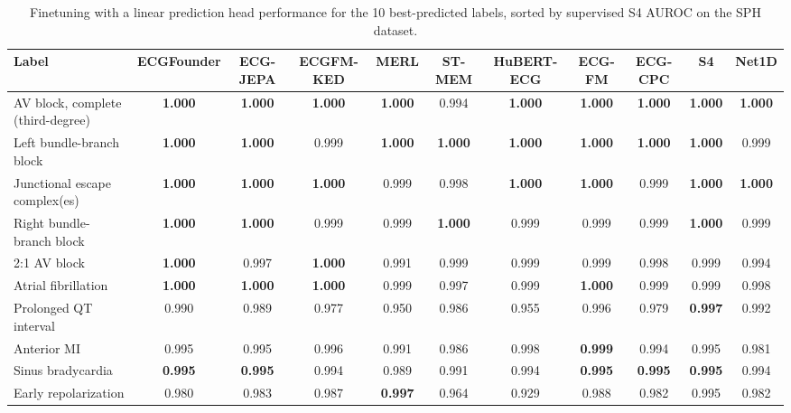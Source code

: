 \documentclass{article}
\begin{document}
                \begin{table}[htbp]
                    \centering
                    \tiny
                    \setlength{\tabcolsep}{2pt}
                    \caption{Finetuning with a linear prediction head performance for the 10 best-predicted labels, sorted by supervised S4 AUROC on the SPH dataset.}
                    \begin{tabular}{lcccccccccc}
                        \toprule
                        \textbf{Label} & \textbf{ECGFounder} & \textbf{ECG-JEPA} & \textbf{ECGFM-KED} & \textbf{MERL} & \textbf{ST-MEM} & \textbf{HuBERT-ECG} & \textbf{ECG-FM} & \textbf{ECG-CPC} & \textbf{S4} & \textbf{Net1D} \\
                        \midrule
                        AV block, complete (third-degree) & \textbf{1.000} & \textbf{1.000} & \textbf{1.000} & \textbf{1.000} & 0.994 & \textbf{1.000} & \textbf{1.000} & \textbf{1.000} & \textbf{1.000} & \textbf{1.000} \\
                        Left bundle-branch block & \textbf{1.000} & \textbf{1.000} & 0.999 & \textbf{1.000} & \textbf{1.000} & \textbf{1.000} & \textbf{1.000} & \textbf{1.000} & \textbf{1.000} & 0.999 \\
                        Junctional escape complex(es) & \textbf{1.000} & \textbf{1.000} & \textbf{1.000} & 0.999 & 0.998 & \textbf{1.000} & \textbf{1.000} & 0.999 & \textbf{1.000} & \textbf{1.000} \\
                        Right bundle-branch block & \textbf{1.000} & \textbf{1.000} & 0.999 & 0.999 & \textbf{1.000} & 0.999 & 0.999 & 0.999 & \textbf{1.000} & 0.999 \\
                        2:1 AV block & \textbf{1.000} & 0.997 & \textbf{1.000} & 0.991 & 0.999 & 0.999 & 0.999 & 0.998 & 0.999 & 0.994 \\
                        Atrial fibrillation & \textbf{1.000} & \textbf{1.000} & \textbf{1.000} & 0.999 & 0.997 & 0.999 & \textbf{1.000} & 0.999 & 0.999 & 0.998 \\
                        Prolonged QT interval & 0.990 & 0.989 & 0.977 & 0.950 & 0.986 & 0.955 & 0.996 & 0.979 & \textbf{0.997} & 0.992 \\
                        Anterior MI & 0.995 & 0.995 & 0.996 & 0.991 & 0.986 & 0.998 & \textbf{0.999} & 0.994 & 0.995 & 0.981 \\
                        Sinus bradycardia & \textbf{0.995} & \textbf{0.995} & 0.994 & 0.989 & 0.991 & 0.994 & \textbf{0.995} & \textbf{0.995} & \textbf{0.995} & 0.994 \\
                        Early repolarization & 0.980 & 0.983 & 0.987 & \textbf{0.997} & 0.964 & 0.929 & 0.988 & 0.982 & 0.995 & 0.982 \\
                        \bottomrule
                    \end{tabular}
                    \label{tab:results_overview_sph}
                \end{table}
                
\end{document}
